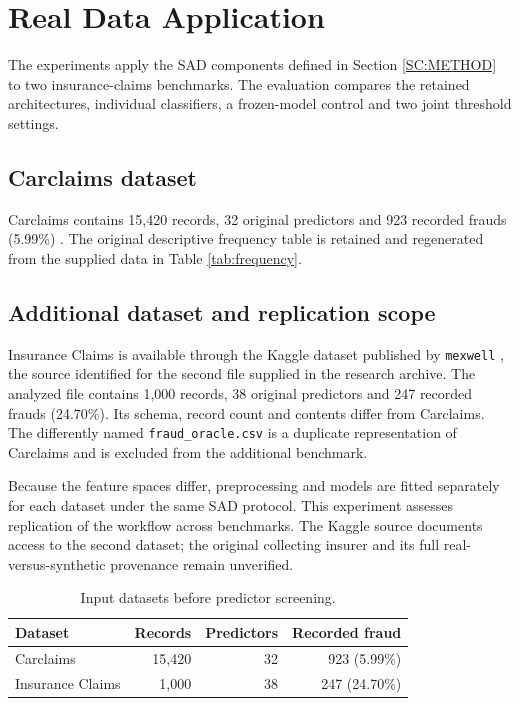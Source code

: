 \section{Real Data Application}\label{SC:RESULT}\label{sec:results}
The experiments apply the SAD components defined in Section
\ref{SC:METHOD} to two insurance-claims benchmarks. The evaluation compares
the retained architectures, individual classifiers, a frozen-model control
and two joint threshold settings.

\subsection*{Carclaims dataset}
Carclaims contains 15,420 records, 32 original predictors and 923 recorded
frauds (5.99\%) \citep{dataset}. The original descriptive frequency table
is retained and regenerated from the supplied data in Table \ref{tab:frequency}.


\subsection{Additional dataset and replication scope}\label{sec:seconddata}
Insurance Claims is available through the Kaggle dataset published by
\texttt{mexwell} \citep{insuranceclaims}, the source identified for the
second file supplied in the research archive. The analyzed file contains
1,000 records, 38 original predictors and 247 recorded frauds (24.70\%).
Its schema, record count and contents differ from Carclaims.
The differently named \texttt{fraud\_oracle.csv} is a duplicate
representation of Carclaims and is excluded from the additional benchmark.

Because the feature spaces differ, preprocessing and models are fitted
separately for each dataset under the same SAD protocol. This experiment
assesses replication of the workflow across benchmarks. The Kaggle source
documents access to the second dataset; the original collecting insurer
and its full real-versus-synthetic provenance remain unverified.

\begin{table}[tbp]\centering
\caption{Input datasets before predictor screening.}\label{tab:data}
\begin{tabular}{lrrr}\toprule
Dataset & Records & Predictors & Recorded fraud\\\midrule
Carclaims & 15,420 & 32 & 923 (5.99\%)\\
Insurance Claims & 1,000 & 38 & 247 (24.70\%)\\
\bottomrule\end{tabular}\end{table}


